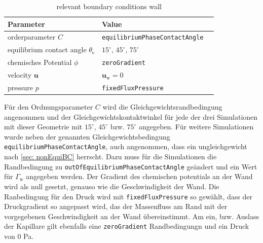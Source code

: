 \begin{table}[h]
    \centering
        \caption{relevant boundary conditions wall}
        \label{tab: BoundaryConditions_wall}
        \begin{tabular}{lll}
            Parameter & Value \\ \hline
            orderparameter $C$ & \texttt{equilibriumPhaseContactAngle}     \\
            equilibrium contact angle $\theta_{\mathrm{e}}$ & $15^{\circ}$, $45^{\circ}$, $75^{\circ}$\\
            chemisches Potential $\phi$   & \texttt{zeroGradient}        \\ 
            velocity $\mathbf{u}$ &   $\mathbf{u_{\mathrm{w}}} = 0$\\
            pressure $p$&  \texttt{fixedFluxPressure} \\
        \end{tabular}
\end{table}
Für den Ordnungsparameter $C$ wird die Gleichgewichtsrandbedingung angenommen und der Gleichgewichtskontaktwinkel für jede der drei Simulationen mit dieser Geometrie mit $15^{\circ}$, $45^{\circ}$ bzw. $75^{\circ}$ angegeben. Für weitere Simulationen wurde neben der genannten Gleichgewichtsbedingung \texttt{equilibriumPhaseContactAngle}, auch angenommen, dass ein ungleichgewicht nach \ref{sec: nonEquiBC} herrscht. Dazu muss für die Simulationen die Randbedingung zu \texttt{outOfEquilibriumPhaseContactAngle} geändert und ein Wert für $\Gamma_{\mathrm{w}}$ angegeben werden. 
Der Gradient des chemischen potentials an der Wand wird als null gesetzt, genauso wie die Geschwindigkeit der Wand. Die Ranbedingung für den Druck wird mit \texttt{fixedFluxPressure} so gewählt, dass der Druckgradient so angepasst wird, das der Massenfluss am Rand mit der vorgegebenen Geschwindigkeit an der Wand übereinstimmt. Am ein, bzw. Auslass der Kapillare gilt ebenfalls eine \texttt{zeroGradient} Randbedingungn und ein Druck von $0$ Pa.

